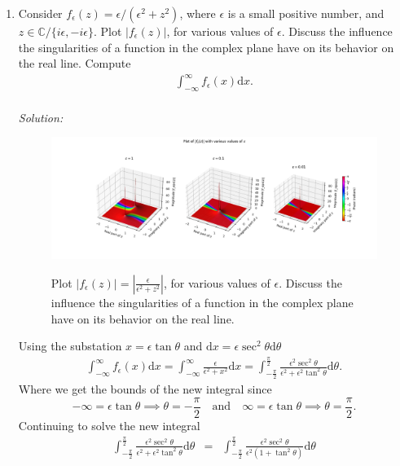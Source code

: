 \documentclass[10pt]{amsart}
\newcommand{\D}{\mathrm{d}}
\theoremstyle{nonumberplain}
\begin{document}
\begin{enumerate}[label={\bf {\arabic*}:}]
\item Consider $f_\epsilon(z)=\epsilon /\left(\epsilon^2+z^2\right)$, where
  $\epsilon$ is a small positive number, and $z \in \mathbb{C} /\{i
  \epsilon,-i \epsilon\}$. Plot $\left|f_\epsilon(z)\right|$, for various
  values of $\epsilon$. Discuss the influence the singularities of a
  function in the complex plane have on its behavior on the real
  line. Compute
  \begin{align*}
    \int_{-\infty}^\infty f_\epsilon(x) \D x.
  \end{align*} \\
\textit{Solution:} \\

\begin{figure}[h]
	\includegraphics[width=1\textwidth]{f_sub_epsilon_vis.png}\label{fig:f1}
 	\caption{
		Plot $\left|f_\epsilon(z)\right| = \left| \frac{\epsilon}{\epsilon^2+z^2}\right|$, for various 
		values of $\epsilon$. Discuss the influence the singularities of a 
		function in the complex plane have on its behavior on the real line.
	}
\end{figure}
\noindent
Using the substation $x = \epsilon \tan \theta$ and $\D x = \epsilon \sec^2 \theta \D \theta$
\begin{eqnarray*}
\int_{-\infty}^\infty f_\epsilon(x) \D x = \int_{-\infty}^\infty \frac{\epsilon} {\epsilon^2+x^2} \D x = \int_{-\frac{\pi}{2}}^{\frac{\pi}{2}} \frac{\epsilon^2 \sec^2 \theta} {\epsilon^2 + \epsilon^2 \tan^2\theta}  \D \theta.
\end{eqnarray*}
Where we get the bounds of the new integral since $$-\infty = \epsilon \tan \theta \implies \theta = -\frac{\pi}{2} \quad \text{and} \quad \infty = \epsilon \tan \theta \implies \theta = \frac{\pi}{2}.$$
Continuing to solve the new integral
\begin{eqnarray*}
\int_{-\frac{\pi}{2}}^{\frac{\pi}{2}} \frac{\epsilon^2 \sec^2 \theta} {\epsilon^2 + \epsilon^2 \tan^2\theta}  \D \theta &=& \int_{-\frac{\pi}{2}}^{\frac{\pi}{2}} \frac{\epsilon^2 \sec^2 \theta} {\epsilon^2 \left(1 + \tan^2\theta\right)}  \D \theta \\ \\

\end{eqnarray*}
\end{enumerate}
\end{document}
